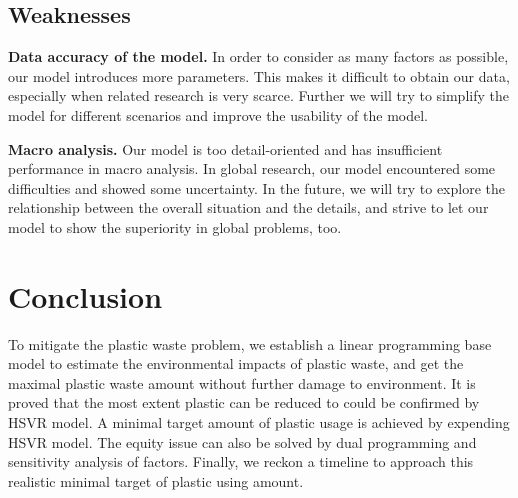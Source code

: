 \documentclass{mcmthesis}
\begin{document}
\subsection{Weaknesses}

\textbf{Data accuracy of the model.} In order to consider as many factors as possible, our model introduces more parameters. This makes it difficult to obtain our data, especially when related research is very scarce. Further we will try to simplify the model for different scenarios and improve the usability of the model.

\textbf{Macro analysis.} Our model is too detail-oriented and has insufficient performance in macro analysis. In global research, our model encountered some difficulties and showed some uncertainty. In the future, we will try to explore the relationship between the overall situation and the details, and strive to let our model to show the superiority in global problems, too.

\section{Conclusion}

To mitigate the plastic waste problem, we establish a linear programming base model to estimate the environmental impacts of plastic waste, and get the maximal plastic waste amount without further damage to environment. It is proved that the most extent plastic can be reduced to could be confirmed by HSVR model. A minimal target amount of plastic usage is achieved by expending HSVR model. The equity issue can also be solved by dual programming and sensitivity analysis of factors. Finally, we reckon a timeline to approach this realistic minimal target of plastic using amount. 

\newpage
\end{document}

